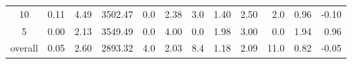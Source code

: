 \begin{table}[H]
\begin{tabular}{c rrrr rr rrr rr}
      10 &           0.11 &        4.49 &    3502.47 &  0.0 &         2.38 &      3.0 &          1.40 &          2.50 &      2.0 &             0.96 & -0.10 \\
       5 &           0.00 &        2.13 &    3549.49 &  0.0 &         4.00 &      0.0 &          1.98 &          3.00 &      0.0 &             1.94 &  0.96 \\
\midrule
 overall &           0.05 &        2.60 &    2893.32 &  4.0 &         2.03 &      8.4 &          1.18 &          2.09 &     11.0 &             0.82 & -0.05 \\
\bottomrule
\end{tabular}
\end{table}